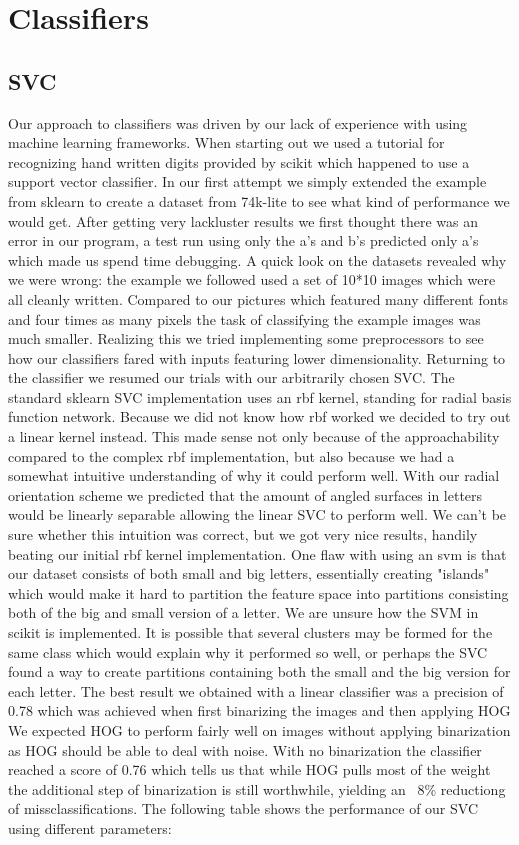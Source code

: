 \documentclass[paper=a4, fontsize=11pt]{scrartcl} %
\numberwithin{equation}{section} %
\numberwithin{figure}{section} %
\numberwithin{table}{section} %
\begin{document}
\section{Classifiers}
\subsection{SVC}
Our approach to classifiers was driven by our lack of experience with
using machine learning frameworks.  When starting out we used a
tutorial for recognizing hand written digits provided by scikit which
happened to use a support vector classifier.
In our first attempt we simply extended the example from sklearn to
create a dataset from 74k-lite to see what kind of performance we
would get.  After getting very lackluster results we first thought
there was an error in our program, a test run using only the a's and
b's predicted only a's which made us spend time debugging.  A quick
look on the datasets revealed why we were wrong: the example we
followed used a set of 10*10 images which were all cleanly written.
Compared to our pictures which featured many different fonts and four
times as many pixels the task of classifying the example images was
much smaller.  Realizing this we tried implementing some preprocessors
to see how our classifiers fared with inputs featuring lower
dimensionality.  Returning to the classifier we resumed our trials
with our arbitrarily chosen SVC.  The standard sklearn SVC
implementation uses an rbf kernel, standing for radial basis function
network.  Because we did not know how rbf worked we decided to try out
a linear kernel instead.  This made sense not only because of the
approachability compared to the complex rbf implementation, but also
because we had a somewhat intuitive understanding of why it could
perform well.  With our radial orientation scheme we predicted that
the amount of angled surfaces in letters would be linearly separable
allowing the linear SVC to perform well.  We can't be sure whether
this intuition was correct, but we got very nice results, handily
beating our initial rbf kernel implementation.  One flaw with using an
svm is that our dataset consists of both small and big letters,
essentially creating "islands" which would make it hard to partition
the feature space into partitions consisting both of the big and small
version of a letter.  We are unsure how the SVM in scikit is
implemented.  It is possible that several clusters may be formed for
the same class which would explain why it performed so well, or
perhaps the SVC found a way to create partitions containing both the
small and the big version for each letter.  The best result we
obtained with a linear classifier was a precision of 0.78 which was
achieved when first binarizing the images and then applying HOG %
We expected HOG to perform fairly well on images without
applying binarization as HOG should be able to deal with noise.  With
no binarization the classifier reached a score of 0.76 which tells us
that while HOG pulls most of the weight the additional step of
binarization is still worthwhile, yielding an ~8\% reductiong of
missclassifications.  The following table shows the performance of our
SVC using different parameters:
\end{document}
